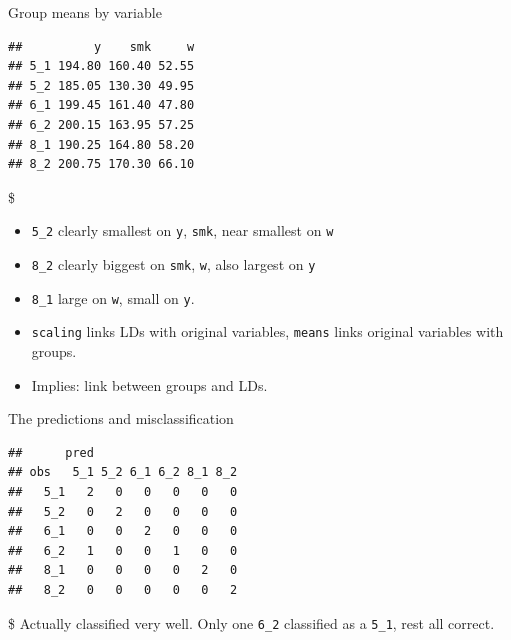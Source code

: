 \documentclass[ignorenonframetext,]{beamer}
\newenvironment{Shaded}{\begin{snugshade}}{\end{snugshade}}
\newcommand{\DataTypeTok}[1]{\textcolor[rgb]{0.13,0.29,0.53}{#1}}
\newcommand{\FloatTok}[1]{\textcolor[rgb]{0.00,0.00,0.81}{#1}}
\newcommand{\KeywordTok}[1]{\textcolor[rgb]{0.13,0.29,0.53}{\textbf{#1}}}
\newcommand{\NormalTok}[1]{#1}
\newcommand{\OperatorTok}[1]{\textcolor[rgb]{0.81,0.36,0.00}{\textbf{#1}}}
\newcommand{\StringTok}[1]{\textcolor[rgb]{0.31,0.60,0.02}{#1}}
\begin{document}
\begin{frame}[fragile]{Group means by variable}
\protect\hypertarget{group-means-by-variable}{}

\begin{Shaded}
\end{Shaded}

\begin{verbatim}
##          y    smk     w
## 5_1 194.80 160.40 52.55
## 5_2 185.05 130.30 49.95
## 6_1 199.45 161.40 47.80
## 6_2 200.15 163.95 57.25
## 8_1 190.25 164.80 58.20
## 8_2 200.75 170.30 66.10
\end{verbatim}

\$

\begin{itemize}
\item
  \texttt{5\_2} clearly smallest on \texttt{y}, \texttt{smk}, near
  smallest on \texttt{w}
\item
  \texttt{8\_2} clearly biggest on \texttt{smk}, \texttt{w}, also
  largest on \texttt{y}
\item
  \texttt{8\_1} large on \texttt{w}, small on \texttt{y}.
\item
  \texttt{scaling} links LDs with original variables, \texttt{means}
  links original variables with groups.
\item
  Implies: link between groups and LDs.
\end{itemize}

\end{frame}

\begin{frame}[fragile]{The predictions and misclassification}
\protect\hypertarget{the-predictions-and-misclassification}{}

\begin{Shaded}
\end{Shaded}

\begin{verbatim}
##      pred
## obs   5_1 5_2 6_1 6_2 8_1 8_2
##   5_1   2   0   0   0   0   0
##   5_2   0   2   0   0   0   0
##   6_1   0   0   2   0   0   0
##   6_2   1   0   0   1   0   0
##   8_1   0   0   0   0   2   0
##   8_2   0   0   0   0   0   2
\end{verbatim}

\$ Actually classified very well. Only one \texttt{6\_2} classified as a
\texttt{5\_1}, rest all correct.

\end{frame}
\end{document}

